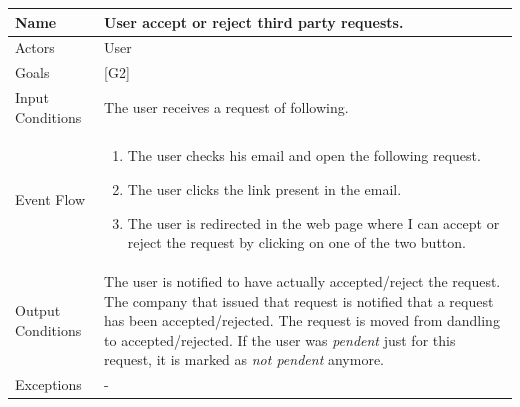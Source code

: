 \documentclass{article}
\begin{document}
\begin{center}
    \begin{tabular}{ | l | p{10cm} |}
    \hline
    Name & User accept or reject third party requests.\\ \hline
    Actors & User\\ \hline
   	Goals & {[G2]}\\ \hline
    Input Conditions & The user receives a request of following.\\ \hline
    Event Flow & \begin{enumerate}
    	\item The user checks his email and open the following request.
		\item The user clicks the link present in the email.
		\item The user is redirected in the web page where I can accept or reject the request by clicking on one of the two button.
    \end{enumerate} \\ \hline
    Output Conditions & The user is notified to have actually accepted/reject the request. The company that issued that request is notified that a request has been accepted/rejected. The request is moved from dandling to accepted/rejected. If the user was \emph{pendent} just for this request, it is marked as \emph{not pendent} anymore. \\ \hline
    Exceptions & -\\ \hline
    \end{tabular}
\end{center}
\end{document}

